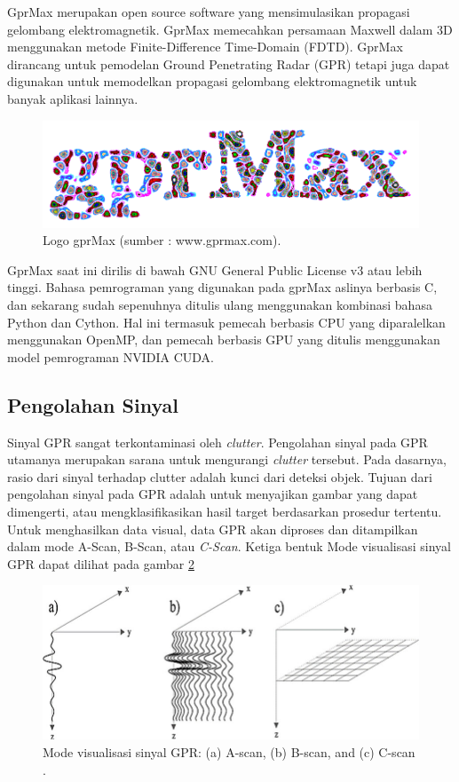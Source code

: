 GprMax merupakan open source software yang mensimulasikan propagasi gelombang elektromagnetik. 
GprMax memecahkan persamaan Maxwell dalam 3D menggunakan metode Finite-Difference Time-Domain (FDTD). 
GprMax dirancang untuk pemodelan Ground Penetrating Radar (GPR) tetapi juga dapat digunakan untuk memodelkan propagasi gelombang elektromagnetik untuk banyak aplikasi lainnya. 

\begin{figure}[ht]
  \centering
  \includegraphics[scale=0.35]{gambar/gprMax.png}
  \caption{Logo gprMax (sumber : www.gprmax.com).}
  \label{fig:logogprMax}
\end{figure}

GprMax saat ini dirilis di bawah GNU General Public License v3 atau lebih tinggi. 
Bahasa pemrograman yang digunakan pada gprMax aslinya berbasis C, dan sekarang sudah sepenuhnya ditulis ulang menggunakan kombinasi bahasa Python dan Cython. 
Hal ini termasuk pemecah berbasis CPU yang diparalelkan menggunakan OpenMP, dan pemecah berbasis GPU yang ditulis menggunakan model pemrograman NVIDIA CUDA. \parencite{gprMax}

\subsection{Pengolahan Sinyal}
\label{subsec:pengolahanSinyal}

Sinyal GPR sangat terkontaminasi oleh \emph{clutter}. 
Pengolahan sinyal pada GPR utamanya merupakan sarana untuk mengurangi \emph{clutter} tersebut. 
Pada dasarnya, rasio dari sinyal terhadap clutter adalah kunci dari deteksi objek. 
Tujuan dari pengolahan sinyal pada GPR adalah untuk menyajikan gambar yang dapat dimengerti, atau mengklasifikasikan hasil target berdasarkan prosedur tertentu. 
Untuk menghasilkan data visual, data GPR akan diproses dan ditampilkan dalam mode A-Scan, B-Scan, atau \emph{C-Scan}. \parencite{3DgprMax}
Ketiga bentuk Mode visualisasi sinyal GPR dapat dilihat pada gambar \ref{fig:scanmodes}

\begin{figure}[ht]
  \centering
  \includegraphics[scale=0.5]{gambar/scanModes.png}
  \caption{Mode visualisasi sinyal GPR: (a) A-scan, (b) B-scan, and (c) C-scan \parencite{scanModes}.}
  \label{fig:scanmodes}
\end{figure}

